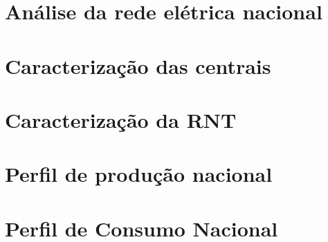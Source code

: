 \section{Análise da rede elétrica nacional}
	


\section{Caracterização das centrais}
	


\section{Caracterização da RNT}
	 


\section{Perfil de produção nacional}
	

\section{Perfil de Consumo Nacional}
	




